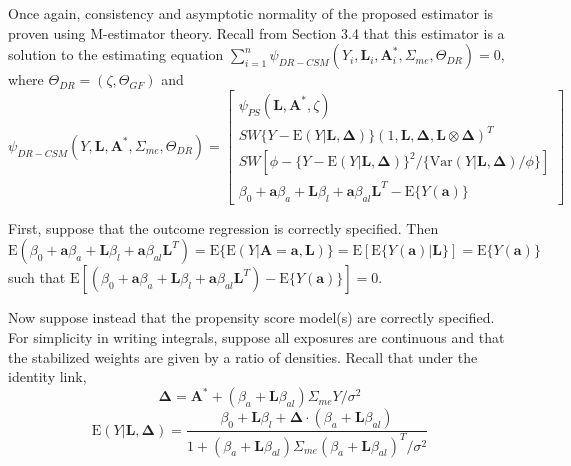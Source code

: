 \documentclass[12pt]{article}
\begin{document}
Once again, consistency and asymptotic normality of the proposed estimator is proven using M-estimator theory. Recall from Section 3.4 that this estimator is a solution to the estimating equation $\sum_{i=1}^{n} \psi_{DR-CSM}(Y_{i}, \bm{L}_{i}, \bm{A}_{i}^{*}, \Sigma_{me}, \Theta_{DR}) = 0$, where $\Theta_{DR} = (\zeta, \Theta_{GF})$ and
\begin{equation*}
    \psi_{DR-CSM}(Y, \bm{L}, \bm{A}^{*}, \Sigma_{me}, \Theta_{DR}) =
    \begin{bmatrix}
        \psi_{PS}(\bm{L}, \bm{A}^{*}, \zeta) \\
       SW\{ Y - \text{E}(Y | \bm{L}, \bm{\Delta}) \} (1, \bm{L}, \bm{\Delta}, \bm{L} \otimes \bm{\Delta})^{T} \\
        SW[\phi - \{ Y - \text{E}(Y | \bm{L}, \bm{\Delta}) \}^{2} / \{ \text{Var}(Y | \bm{L}, \bm{\Delta}) / \phi \}] \\
        \beta_{0} + \bm{a}\beta_{a} + \bm{L}\beta_{l} +
        \bm{a}\beta_{al}\bm{L}^{T} - \text{E} \{ Y(\bm{a}) \}
    \end{bmatrix}
\end{equation*}

First, suppose that the outcome regression is correctly specified. Then $\text{E}( \beta_{0} + \bm{a}\beta_{a} + \bm{L}\beta_{l} + \bm{a}\beta_{al}\bm{L}^{T}) = \text{E} \{ \text{E}(Y | \bm{A} = \bm{a}, \bm{L}) \} = \text{E}[\text{E} \{ Y(\bm{a}) | \bm{L} \}] = \text{E} \{ Y(\bm{a}) \}$ such that $\text{E}[(\beta_{0} + \bm{a}\beta_{a} + \bm{L}\beta_{l} + \bm{a}\beta_{al}\bm{L}^{T}) - \text{E} \{ Y(\bm{a}) \}] = 0$.

Now suppose instead that the propensity score model(s) are correctly specified. For simplicity in writing integrals, suppose all exposures are continuous and that the stabilized weights are given by a ratio of densities. Recall that under the identity link,
\begin{equation*}
\bm{\Delta} = \bm{A}^{*} + (\beta_{a} + \bm{L}\beta_{al}) \Sigma_{me}Y / \sigma^{2}
\end{equation*}
\begin{equation*}
\text{E}(Y | \bm{L}, \bm{\Delta}) = \frac{\beta_{0} + \bm{L}\beta_{l} + \bm{\Delta} \cdot (\beta_{a} + \bm{L}\beta_{al})}{1 + (\beta_{a} + \bm{L}\beta_{al}) \Sigma_{me} (\beta_{a} + \bm{L}\beta_{al})^{T} / \sigma^{2}}
\end{equation*}
\end{document}

